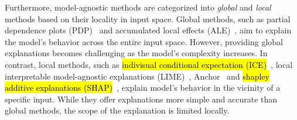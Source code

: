 \documentclass[runningheads]{llncs}
\begin{document}
{Furthermore, model-agnostic methods are categorized into
\emph{global} and \emph{local} methods based on their locality in input space.
Global methods,
such as partial dependence plots (PDP)~\cite{friedman2001greedy}
and accumulated local effects (ALE)~\cite{apley2020visualizing},
aim to explain the model's behavior across the entire input space.
However, providing global explanations becomes challenging
as the model's complexity increases.
In contrast, local methods,
such as \hl{indivisual conditional expectation (ICE)}~\cite{goldstein2015peeking},
local interpretable model-agnostic explanations
(LIME)~\cite{ribeiro2016why}, Anchor~\cite{ribeiro2018anchors} and
\hl{shapley additive explanations (SHAP)}~\cite{lundberg2017unified},
explain model's behavior in the vicinity of a specific input.
While they offer explanations more simple and accurate
than global methods,
the scope of the explanation is limited locally.

}
\end{document}
